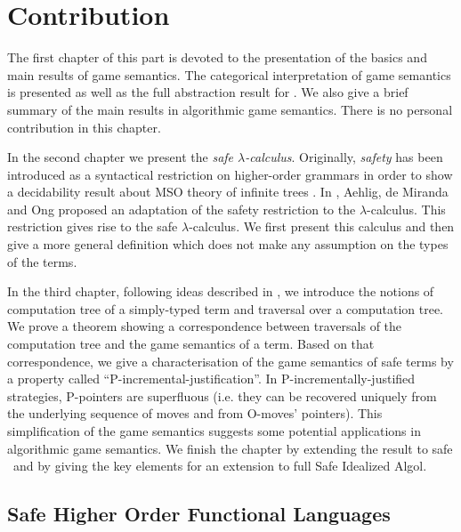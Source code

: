 \part{Contribution}

The first chapter of this part is devoted to the presentation of the
basics and main results of game semantics. The categorical
interpretation of game semantics is presented as well as the full
abstraction result for \pcf. We also give a brief summary of the
main results in algorithmic game semantics. There is no personal
contribution in this chapter.

In the second chapter we present the \emph{safe $\lambda$-calculus}.
Originally, \emph{safety} has been introduced as a syntactical
restriction on higher-order grammars in order to show a decidability
result about MSO theory of infinite trees \citep{KNU02}. In
\cite{safety-mirlong2004}, Aehlig, de Miranda and Ong  proposed an
adaptation of the safety restriction to the $\lambda$-calculus. This
restriction gives rise to the safe $\lambda$-calculus. We first
present this calculus and then give a more general definition which
does not make any assumption on the types of the terms.

In the third chapter, following ideas described in
\cite{OngLics2006}, we introduce the notions of computation tree of
a simply-typed term and traversal over a computation tree. We prove
a theorem showing a correspondence between traversals of the
computation tree and the game semantics of a term. Based on that
correspondence, we give a characterisation of the game semantics of
safe terms by a property called ``P-incremental-justification''. In
P-incrementally-justified strategies, P-pointers are superfluous (i.e.
they can be recovered uniquely from the underlying sequence of
moves and from O-moves' pointers). This simplification of the game semantics suggests some potential applications in algorithmic game semantics. We finish the
chapter by extending the result to safe \pcf\ and by giving the key
elements for an extension to full Safe Idealized Algol.




\chapter{Safe Higher Order Functional Languages}

